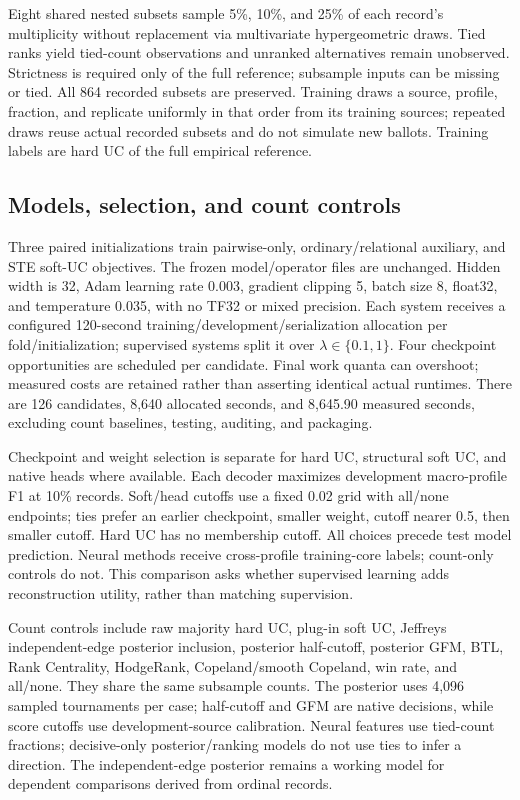 Eight shared nested subsets sample 5\%, 10\%, and 25\% of each record's multiplicity without replacement via multivariate hypergeometric draws. Tied ranks yield tied-count observations and unranked alternatives remain unobserved. Strictness is required only of the full reference; subsample inputs can be missing or tied. All 864 recorded subsets are preserved. Training draws a source, profile, fraction, and replicate uniformly in that order from its training sources; repeated draws reuse actual recorded subsets and do not simulate new ballots. Training labels are hard UC of the full empirical reference.

\subsection{Models, selection, and count controls}
Three paired initializations train pairwise-only, ordinary/relational auxiliary, and STE soft-UC objectives. The frozen model/operator files are unchanged. Hidden width is 32, Adam learning rate 0.003, gradient clipping 5, batch size 8, float32, and temperature 0.035, with no TF32 or mixed precision. Each system receives a configured 120-second training/development/serialization allocation per fold/initialization; supervised systems split it over $\lambda\in\{0.1,1\}$. Four checkpoint opportunities are scheduled per candidate. Final work quanta can overshoot; measured costs are retained rather than asserting identical actual runtimes. There are 126 candidates, 8,640 allocated seconds, and 8,645.90 measured seconds, excluding count baselines, testing, auditing, and packaging.

Checkpoint and weight selection is separate for hard UC, structural soft UC, and native heads where available. Each decoder maximizes development macro-profile F1 at 10\% records. Soft/head cutoffs use a fixed 0.02 grid with all/none endpoints; ties prefer an earlier checkpoint, smaller weight, cutoff nearer 0.5, then smaller cutoff. Hard UC has no membership cutoff. All choices precede test model prediction. Neural methods receive cross-profile training-core labels; count-only controls do not. This comparison asks whether supervised learning adds reconstruction utility, rather than matching supervision.

Count controls include raw majority hard UC, plug-in soft UC, Jeffreys independent-edge posterior inclusion, posterior half-cutoff, posterior GFM, BTL, Rank Centrality, HodgeRank, Copeland/smooth Copeland, win rate, and all/none. They share the same subsample counts. The posterior uses 4,096 sampled tournaments per case; half-cutoff and GFM are native decisions, while score cutoffs use development-source calibration. Neural features use tied-count fractions; decisive-only posterior/ranking models do not use ties to infer a direction. The independent-edge posterior remains a working model for dependent comparisons derived from ordinal records.

